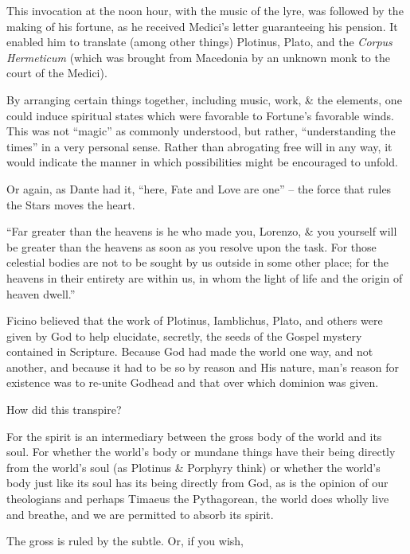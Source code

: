 This invocation at the noon hour, with the music of the lyre, was followed by the making of his fortune, as he received Medici's letter guaranteeing his pension. It enabled him to translate (among other things) Plotinus, Plato, and the \emph{Corpus Hermeticum} (which was brought from Macedonia by an unknown monk to the court of the Medici).

By arranging certain things together, including music, work, \& the elements, one could induce spiritual states which were favorable to Fortune's favorable winds. This was not ``magic'' as commonly understood, but rather, ``understanding the times'' in a very personal sense. Rather than abrogating free will in any way, it would indicate the manner in which possibilities might be encouraged to unfold.

Or again, as Dante had it, ``here, Fate and Love are one'' -- the force that rules the Stars moves the heart.

\begin{quotex}
``Far greater than the heavens is he who made you, Lorenzo, \& you yourself will be greater than the heavens as soon as you resolve upon the task. For those celestial bodies are not to be sought by us outside in some other place; for the heavens in their entirety are within us, in whom the light of life and the origin of heaven dwell.''
\end{quotex}


Ficino believed that the work of Plotinus, Iamblichus, Plato, and others were given by God to help elucidate, secretly, the seeds of the Gospel mystery contained in Scripture. Because God had made the world one way, and not another, and because it had to be so by reason and His nature, man's reason for existence was to re-unite Godhead and that over which dominion was given.

How did this transpire?

\begin{quotex}
For the spirit is an intermediary between the gross body of the world and its soul. For whether the world's body or mundane things have their being directly from the world's soul (as Plotinus \& Porphyry think) or whether the world's body just like its soul has its being directly from God, as is the opinion of our theologians and perhaps Timaeus the Pythagorean, the world does wholly live and breathe, and we are permitted to absorb its spirit.
\end{quotex}


The gross is ruled by the subtle. Or, if you wish,

